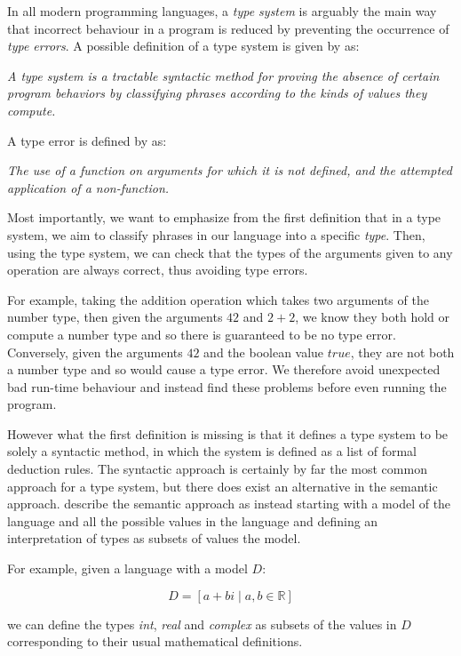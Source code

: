 \documentclass{l4proj}
\begin{document}
In all modern programming languages, a \emph{type system} is arguably the main way that incorrect behaviour in a program is reduced by preventing the occurrence of \emph{type errors}.
A possible definition of a type system is given by \citet{Pierce2002} as:

\emph{A type system is a tractable syntactic method for proving the absence of certain program behaviors by classifying phrases according to the kinds of values they compute.}

A type error is defined by \citet{wright1994} as:

\emph{The use of a function on arguments for which it is not defined, and the attempted application of a non-function.}

Most importantly, we want to emphasize from the first definition that in a type system, we aim to classify phrases in our language into a specific \emph{type}.
Then, using the type system, we can check that the types of the arguments given to any operation are always correct, thus avoiding type errors.

For example, taking the addition operation which takes two arguments of the number type, then given the arguments $42$ and $2 + 2$, we know they both hold or compute a number type and so there is guaranteed to be no type error.
Conversely, given the arguments $42$ and the boolean value $true$, they are not both a number type and so would cause a type error.
We therefore avoid unexpected bad run-time behaviour and instead find these problems before even running the program.

However what the first definition is missing is that it defines a type system to be solely a syntactic method, in which the system is defined as a list of formal deduction rules.
The syntactic approach is certainly by far the most common approach for a type system, but there does exist an alternative in the semantic approach.
\citet{Frisch2002} describe the semantic approach as instead starting with a model of the language and all the possible values in the language and defining an interpretation of types as subsets of values the model.

For example, given a language with a model $D$:

\begin{equation}
    D = \left[ a + bi \mid a, b \in \mathbb{R}\right]
\end{equation}

we can define the types \emph{int}, \emph{real} and \emph{complex} as subsets of the values in $D$ corresponding to their usual mathematical definitions.
\end{document}
